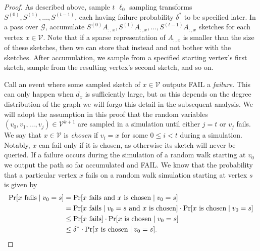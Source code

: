 \documentclass[10]{report}
\begin{document}
\begin{proof}
As described above, sample $t$ $\ell_0$ sampling transforms $S^{(0)}, S^{(1)}, \dots, S^{(t-1)}$, each having failure probability $\delta^*$ to be specified later.
In a pass over $\mathcal{G}$, accumulate $S^{(0)}A_{:,x}, S^{(1)}A_{:,x}, \dots, S^{(t-1)}A_{:,x}$ sketches for each vertex $x \in \mathcal{V}$.
Note that if a sparse representation of $A_{:,x}$ is smaller than the size of these sketches, then we can store that instead and not bother with the sketches. 
After accumulation, we sample from a specified starting vertex's first sketch, sample from the resulting vertex's second sketch, and so on. 

Call an event where some sampled sketch of $x \in \mathcal{V}$ outputs FAIL a \emph{failure}. 
This can only happen when $d_x$ is sufficiently large, but as this depends on the degree distribution of the graph we will forgo this detail in the subsequent analysis.
We will adopt the assumption in this proof that the random variables $(v_0, v_1, \dots, v_j) \in \mathcal{V}^{k+1}$ are sampled in a simulation until either $j = t$ or $v_j$ fails.
We say that $x \in \mathcal{V}$ is \emph{chosen} if $v_i = x$ for some $0 \leq i < t$ during a simulation.
Notably, $x$ can fail only if it is chosen, as otherwise its sketch will never be queried.
If a failure occurs during the simulation of a random walk starting at $v_0$ we output the path so far accumulated and FAIL. 
We know that the probability that a particular vertex $x$ fails on a random walk simulation starting at vertex $s$ is given by
%
\begin{align}
\nonumber
\Pr [\textnormal{$x$ fails} \mid v_0 = s ]
&=
\Pr [\textnormal{$x$ fails and $x$ is chosen} \mid v_0 = s ]
\\
\nonumber
&=
\Pr [\textnormal{$x$ fails} \mid \textnormal{$v_0 = s$ and $x$ is chosen} ] \cdot \Pr [\textnormal{$x$ is chosen} \mid v_0 = s ]
\\
\nonumber
&\leq
\Pr [\textnormal{$x$ fails}] \cdot \Pr [\textnormal{$x$ is chosen} \mid v_0 = s ]
\\
\label{eq:sample:fail:prob}
&\leq
\delta^* \cdot \Pr [\textnormal{$x$ is chosen} \mid v_0 = s ].
\end{align}


\end{proof}
\end{document}

